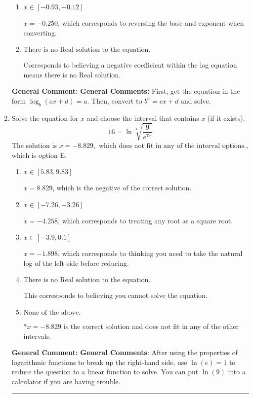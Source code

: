 \documentclass{extbook}[14pt]
\newcommand{\litem}[1]{\item #1

\rule{\textwidth}{0.4pt}}
\begin{document}
\begin{enumerate}
{\begin{enumerate}[label=\Alph*.]
$x = 2.250$, which corresponds to reversing the base and exponent when converting and reversing the value with $x$.
\item \( x \in [-0.93, -0.12] \)

$x = -0.250$, which corresponds to reversing the base and exponent when converting.
\item \( \text{There is no Real solution to the equation.} \)

Corresponds to believing a negative coefficient within the log equation means there is no Real solution.
\end{enumerate}

\textbf{General Comment:} \textbf{General Comments:} First, get the equation in the form $\log_b{(cx+d)} = a$. Then, convert to $b^a = cx+d$ and solve.
}
\litem{
 Solve the equation for $x$ and choose the interval that contains $x$ (if it exists).
\[  16 = \ln{\sqrt[4]{\frac{9}{e^{7x}}}} \]The solution is \( x = -8.829, \text{ which does not fit in any of the interval options.} \), which is option E.\begin{enumerate}[label=\Alph*.]
\item \( x \in [5.83, 9.83] \)

$x = 8.829$, which is the negative of the correct solution.
\item \( x \in [-7.26, -3.26] \)

$x = -4.258$, which corresponds to treating any root as a square root.
\item \( x \in [-3.9, 0.1] \)

$x = -1.898$, which corresponds to thinking you need to take the natural log of the left side before reducing.
\item \( \text{There is no Real solution to the equation.} \)

This corresponds to believing you cannot solve the equation.
\item \( \text{None of the above.} \)

*$x = -8.829$ is the correct solution and does not fit in any of the other intervals.
\end{enumerate}

\textbf{General Comment:} \textbf{General Comments}: After using the properties of logarithmic functions to break up the right-hand side, use $\ln(e) = 1$ to reduce the question to a linear function to solve. You can put $\ln(9)$ into a calculator if you are having trouble.
}
\end{enumerate}
\end{document}
